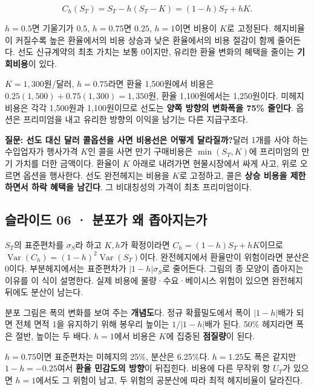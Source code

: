\documentclass[11pt,a4paper]{article}
\begin{document}
\[
C_h(S_T)=S_T-h(S_T-K)=(1-h)S_T+hK.
\]

$h=0.5$면 기울기가 $0.5$, $h=0.75$면 $0.25$, $h=1$이면 비용이 $K$로 고정된다. 헤지비율이 커질수록 높은 환율에서의 비용 상승과 낮은 환율에서의 비용 절감이 함께 줄어든다. 선도 신규계약의 최초 가치는 보통 0이지만, 유리한 환율 변화의 혜택을 줄이는 \textbf{기회비용}이 있다.\par

$K=1{,}300$원/달러, $h=0.75$라면 환율 1,500원에서 비용은 $0.25(1{,}500)+0.75(1{,}300)=1{,}350$원, 환율 1,100원에서는 1,250원이다. 미헤지 비용은 각각 1,500원과 1,100원이므로 선도는 \textbf{양쪽 방향의 변화폭을 75\% 줄인다}. 옵션은 프리미엄을 내고 유리한 방향의 이익을 남기는 다른 지급구조다.\par

\par\medskip\noindent\textbf{질문: 선도 대신 달러 콜옵션을 사면 비용선은 어떻게 달라질까?}\quad 달러 1개를 사야 하는 수입업자가 행사가격 $K$인 콜을 사면 만기 구매비용은 $\min(S_T,K)$에 프리미엄의 만기 가치를 더한 금액이다. 환율이 $K$ 아래로 내려가면 현물시장에서 싸게 사고, 위로 오르면 옵션을 행사한다. 선도 완전헤지는 비용을 $K$로 고정하고, 콜은 \textbf{상승 비용을 제한하면서 하락 혜택을 남긴다}. 그 비대칭성의 가격이 최초 프리미엄이다.\par

\subsection{슬라이드 06 · 분포가 왜 좁아지는가}
$S_T$의 표준편차를 $\sigma_S$라 하고 $K,h$가 확정이라면 $C_h=(1-h)S_T+hK$이므로 $\operatorname{Var}(C_h)=(1-h)^2\operatorname{Var}(S_T)$이다. 완전헤지에서 환율만이 위험이라면 분산은 0이다. 부분헤지에서는 표준편차가 $|1-h|\sigma_S$로 줄어든다. 그림의 종 모양이 좁아지는 이유를 이 식이 설명한다. 실제 비용에 물량·수요·베이시스 위험이 있으면 완전헤지 뒤에도 분산이 남는다.\par

분포 그림은 폭의 변화를 보여 주는 \textbf{개념도}다. 정규 확률밀도에서 폭이 $|1-h|$배가 되면 전체 면적 1을 유지하기 위해 봉우리 높이는 $1/|1-h|$배가 된다. 50\% 헤지라면 폭은 절반, 높이는 두 배다. $h=1$에서 비용은 $K$에 집중된 \textbf{점질량}이 된다.\par

$h=0.75$이면 표준편차는 미헤지의 25\%, 분산은 6.25\%다. $h=1.25$도 폭은 같지만 $1-h=-0.25$여서 \textbf{환율 민감도의 방향}이 뒤집힌다. 비용에 다른 무작위 항 $U_T$가 있으면 $h=1$에서도 그 위험이 남고, 두 위험의 공분산에 따라 최적 헤지비율이 달라진다.\par
\end{document}
